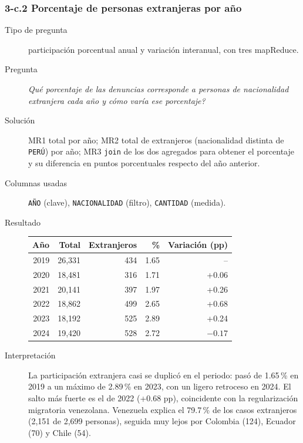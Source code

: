 \subsubsection*{3-c.2 \textbar{} Porcentaje de personas extranjeras por a\~no}
\begin{description}
\item[Tipo de pregunta] participaci\'on porcentual anual y variaci\'on interanual, con tres
      mapReduce.
\item[Pregunta] \emph{Qu\'e porcentaje de las denuncias corresponde a personas de nacionalidad
      extranjera cada a\~no y c\'omo var\'ia ese porcentaje?}
\item[Soluci\'on] MR1 total por a\~no; MR2 total de extranjeros (nacionalidad distinta de
      \texttt{PER\'U}) por a\~no; MR3 \texttt{join} de los dos agregados para obtener el
      porcentaje y su diferencia en puntos porcentuales respecto del a\~no anterior.
\item[Columnas usadas] \texttt{A\~NO} (clave), \texttt{NACIONALIDAD} (filtro),
      \texttt{CANTIDAD} (medida).
\item[Resultado]
\begin{center}
\begin{tabular}{rrrrr}
\toprule
A\~no & Total & Extranjeros & \% & Variaci\'on (pp)\\
\midrule
2019 & 26,331 & 434 & 1.65 & --\\
2020 & 18,481 & 316 & 1.71 & +0.06\\
2021 & 20,141 & 397 & 1.97 & +0.26\\
2022 & 18,862 & 499 & 2.65 & +0.68\\
2023 & 18,192 & 525 & 2.89 & +0.24\\
2024 & 19,420 & 528 & 2.72 & $-0.17$\\
\bottomrule
\end{tabular}
\end{center}
\item[Interpretaci\'on] La participaci\'on extranjera casi se duplic\'o en el periodo: pas\'o de
      1.65\,\% en 2019 a un m\'aximo de 2.89\,\% en 2023, con un ligero retroceso en 2024. El
      salto m\'as fuerte es el de 2022 (+0.68 pp), coincidente con la regularizaci\'on migratoria
      venezolana. Venezuela explica el 79.7\,\% de los casos extranjeros (2,151 de 2,699
      personas), seguida muy lejos por Colombia (124), Ecuador (70) y Chile (54).
\end{description}

